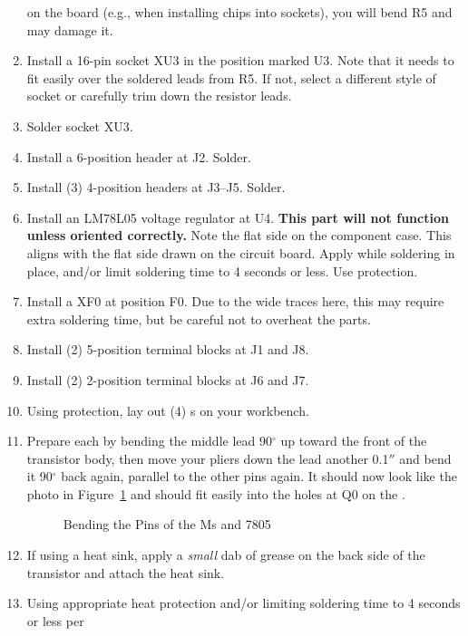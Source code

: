 \documentclass[letterpaper,twoside,onecolumn,openright,final]{memoir}
\begin{document}
\begin{enumerate}
	on the board (e.g., when installing chips into sockets), you will bend R5 and may
	damage it.
\item	Install a 16-pin  socket XU3 in the position marked U3.  
	Note that it needs to fit easily
	over the soldered leads from R5.  If not, select a different style of socket or
	carefully trim down the resistor leads.
\item	Solder socket XU3.
\item	Install a 6-position  header at J2.  Solder.
\item	Install (3) 4-position  headers at J3--J5.  Solder.
\item	Install an LM78L05 voltage regulator at U4.  
	{\bfseries This part will not function unless oriented correctly.}  Note the flat side on
	the component case.  This aligns with the flat side drawn on the circuit board.
	Apply  while soldering in
	place, and/or limit soldering time to 4 seconds or less.  Use  protection.
\item	Install a  XF0 at position F0.  Due to the wide  traces here, this may require
	extra soldering time, but be careful not to overheat the parts.
\item
	Install (2) 5-position terminal blocks at J1 and J8.  
\item
	Install (2) 2-position terminal blocks at J6 and J7.  
\item\label{s:MOSFET1}
	Using  protection, lay out (4) s on your workbench.
\item	Prepare each  by bending the middle lead 90$^\circ$ up toward the front
	of the transistor body, then move your pliers down the lead another 0.1$''$ and bend it
	90$^\circ$
	back again, parallel to the other pins again.  It should now look like the photo
	in Figure~\ref{fig:mosfet} and should fit
	easily into the holes at Q0 on the .
\begin{figure}
	\centerline{ }
	\caption{Bending the Pins of the Ms and 7805\label{fig:mosfet}}
\end{figure}
\item	If using a heat sink, apply a \emph{small} dab of  grease on the back side of the transistor and attach the heat sink.
\item	Using appropriate heat protection and/or limiting soldering time to 4 seconds or less per

\end{enumerate}
\end{document}

